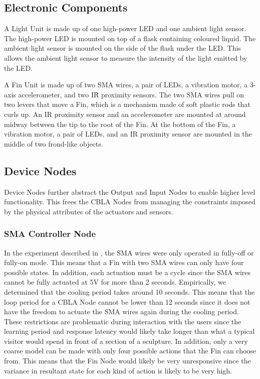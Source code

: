 \subsection{Electronic Components}

A Light Unit is made up of one high-power LED and one ambient light sensor. The high-power LED is mounted on top of a flask containing coloured liquid. The ambient light sensor is mounted on the side of the flask under the LED. This allows the ambient light sensor to measure the intensity of the light emitted by the LED. 

A Fin Unit is made up of two SMA wires, a pair of LEDs, a vibration motor, a 3-axis accelerometer, and two IR proximity sensors. The two SMA wires pull on two levers that move a Fin, which is a mechanism made of soft plastic rods that curls up. An IR proximity sensor and an accelerometer are mounted at around midway between the tip to the root of the Fin. At the bottom of the Fin, a vibration motor, a pair of LEDs, and an IR proximity sensor are mounted in the middle of two frond-like objects. 

\subsection{Device Nodes}

Device Nodes further abstract the Output and Input Nodes to enable higher level functionality. This frees the CBLA Nodes from managing the constraints imposed by the physical attributes of the actuators and sensors. 

\subsubsection{SMA Controller Node}

In the experiment described in , the SMA wires were only operated in fully-off or fully-on mode. This means that a Fin with two SMA wires can only have four possible states. In addition, each actuation must be a cycle since the SMA wires cannot be fully actuated at 5V for more than 2 seconds. Empirically, we determined that the cooling period takes around 10 seconds. This means that the loop period for a CBLA Node cannot be lower than 12 seconds since it does not have the freedom to actuate the SMA wires again during the cooling period. These restrictions are problematic during interaction with the users since the learning period and response latency would likely take longer than what a typical visitor would spend in front of a section of a sculpture. In addition, only a very coarse model can be made with only four possible actions that the Fin can choose from. This means that the Fin Node would likely be very unresponsive since the variance in resultant state for each kind of action is likely to be very high.

